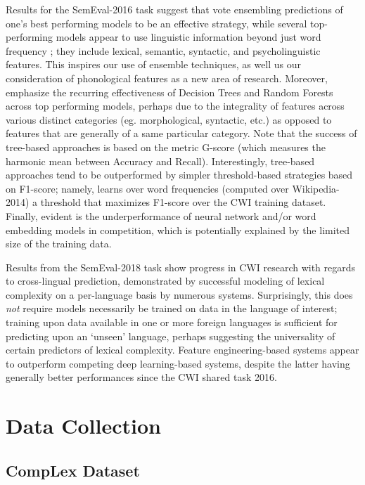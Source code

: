 \documentclass{dcthesis}
\theoremstyle{definition}
\theoremstyle{remark}
\begin{document}
Results for the SemEval-2016 task \citep{zampieri2017complex} suggest that vote ensembling predictions of one's best performing models to be an effective strategy, while several top-performing models appear to use linguistic information beyond just word frequency \citep{paetzold2016sv000gg, ronzano2016taln, mukherjee2016ju_nlp}; they include lexical, semantic, syntactic, and psycholinguistic features. This inspires our use of ensemble techniques, as well us our consideration of phonological features as a new area of research. Moreover, \citet{zampieri2017complex} emphasize the recurring effectiveness of Decision Trees and Random Forests across top performing models, perhaps due to the integrality of features across various distinct categories (eg. morphological, syntactic, etc.) as opposed to features that are generally of a same particular category. Note that the success of tree-based approaches is based on the metric G-score (which measures the harmonic mean between Accuracy and Recall). Interestingly, tree-based approaches tend to be outperformed by simpler threshold-based strategies based on F1-score; namely, \citet{wrobel2016plujagh} learns over word frequencies (computed over Wikipedia-2014) a threshold that maximizes F1-score over the CWI training dataset. Finally, evident is the underperformance of neural network and/or word embedding models in competition, which is potentially explained by the limited size of the training data.

Results from the SemEval-2018 task \citep{yimam2018report} show progress in CWI research with regards to cross-lingual prediction, demonstrated by successful modeling of lexical complexity on a per-language basis by numerous systems. Surprisingly, this does \textit{not} require models necessarily be trained on data in the language of interest; training upon data available in one or more foreign languages is sufficient for predicting upon an `unseen' language, perhaps suggesting the universality of certain predictors of lexical complexity. Feature engineering-based systems appear to outperform competing deep learning-based systems, despite the latter having generally better performances since the CWI shared task 2016. 

\chapter{Data Collection}

\section{CompLex Dataset}
\end{document}
